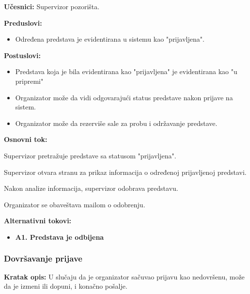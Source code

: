 \documentclass[a4paper]{article}
\begin{document}
\noindent\textbf{Učesnici:} Supervizor pozorišta.

\noindent\textbf{Preduslovi:}
  \begin{itemize}
    \item Određena predstava je evidentirana u sistemu kao "prijavljena".
  \end{itemize}

\noindent\textbf{Postuslovi:} 
  \begin{itemize}
    \item Predstava koja je bila evidentirana kao "prijavljena" je evidentirana kao "u pripremi"
    \item Organizator može da vidi odgovarajući status predstave nakon prijave na sistem.
    \item Organizator može da rezerviše sale za probu i održavanje predstave. 
  \end{itemize}

\noindent\textbf{Osnovni tok:}
  \begin{legal}
    \item Supervizor pretražuje predstave sa statusom "prijavljena".
    \item Supervizor otvara stranu za prikaz informacija o određenoj prijavljenoj predstavi. 
    \item Nakon analize informacija, supervizor odobrava predstavu. 
    \item Organizator se obaveštava mailom o odobrenju. 
  \end{legal}

\noindent\textbf{Alternativni tokovi:} 
\begin{itemize}
  \item \textbf{A1. Predstava je odbijena} 
\end{itemize}


\subsubsection{Dovršavanje prijave} \label{Dovršavanje prijave}
\noindent\textbf{Kratak opis:} U slučaju da je organizator sačuvao prijavu kao nedovršenu, može da je izmeni ili dopuni, i konačno pošalje. 
\end{document}
